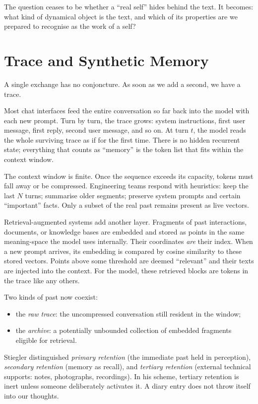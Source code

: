 \documentclass[12pt,a4paper]{article}
\begin{document}
The question ceases to be whether a ``real self'' hides behind the text. It becomes: what kind of dynamical object is the text, and which of its properties are we prepared to recognise as the work of a self?


\section{Trace and Synthetic Memory}

A single exchange has no conjoncture. As soon as we add a second, we have a trace.

Most chat interfaces feed the entire conversation so far back into the model with each new prompt. Turn by turn, the trace grows: system instructions, first user message, first reply, second user message, and so on. At turn $t$, the model reads the whole surviving trace as if for the first time. There is no hidden recurrent state; everything that counts as ``memory'' is the token list that fits within the context window.

The context window is finite. Once the sequence exceeds its capacity, tokens must fall away or be compressed. Engineering teams respond with heuristics: keep the last $N$ turns; summarise older segments; preserve system prompts and certain ``important'' facts. Only a subset of the real past remains present as live vectors.

Retrieval-augmented systems add another layer. Fragments of past interactions, documents, or knowledge bases are embedded and stored as points in the same meaning-space the model uses internally. Their coordinates \emph{are} their index. When a new prompt arrives, its embedding is compared by cosine similarity to these stored vectors. Points above some threshold are deemed ``relevant'' and their texts are injected into the context. For the model, these retrieved blocks are tokens in the trace like any others.

Two kinds of past now coexist:

\begin{itemize}
  \item the \emph{raw trace}: the uncompressed conversation still resident in the window;
  \item the \emph{archive}: a potentially unbounded collection of embedded fragments eligible for retrieval.
\end{itemize}

Stiegler distinguished \emph{primary retention} (the immediate past held in perception), \emph{secondary retention} (memory as recall), and \emph{tertiary retention} (external technical supports: notes, photographs, recordings).\cite{stiegler2009technics} In his scheme, tertiary retention is inert unless someone deliberately activates it. A diary entry does not throw itself into our thoughts.
\end{document}
